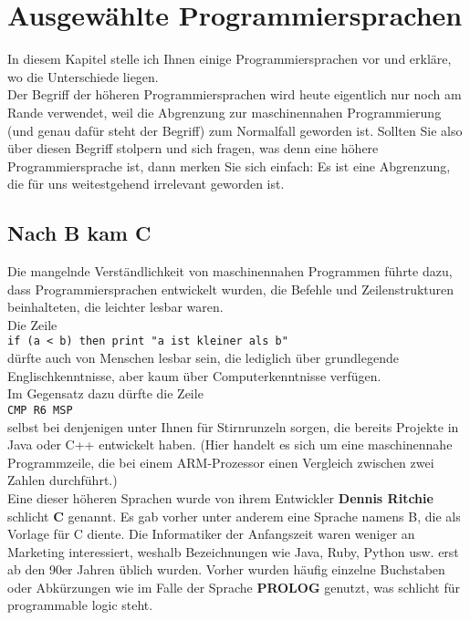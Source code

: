 \chapter{Ausgewählte Programmiersprachen}
In diesem Kapitel stelle ich Ihnen einige Programmiersprachen vor und erkläre, wo die Unterschiede liegen.\\

Der Begriff der höheren Programmiersprachen wird heute eigentlich nur noch am Rande verwendet, weil die Abgrenzung zur maschinennahen Programmierung (und genau dafür steht der Begriff) zum Normalfall geworden ist. Sollten Sie also über diesen Begriff stolpern und sich fragen, was denn eine höhere Programmiersprache ist, dann merken Sie sich einfach: Es ist eine Abgrenzung, die für uns weitestgehend irrelevant geworden ist.

\section{Nach B kam C}
Die mangelnde Verständlichkeit von maschinennahen Programmen führte dazu, dass Programmiersprachen entwickelt wurden, die Befehle und Zeilenstrukturen beinhalteten, die leichter lesbar waren.\\

Die Zeile \\

\verb~if (a < b) then print "a ist kleiner als b"~\\

dürfte auch von Menschen lesbar sein, die lediglich über grundlegende Englischkenntnisse, aber kaum über Computerkenntnisse verfügen.\\

Im Gegensatz dazu dürfte die Zeile\\

\verb~CMP R6 MSP~\\

selbst bei denjenigen unter Ihnen für Stirnrunzeln sorgen, die bereits Projekte in Java oder C++ entwickelt haben. (Hier handelt es sich um eine maschinennahe Programmzeile, die bei einem ARM-Prozessor einen Vergleich zwischen zwei Zahlen durchführt.)\\

Eine dieser höheren Sprachen wurde von ihrem Entwickler \textbf{Dennis Ritchie} schlicht \textbf{C} genannt. Es gab vorher unter anderem eine Sprache namens B, die als Vorlage für C diente. Die Informatiker der Anfangszeit waren weniger an Marketing interessiert, weshalb Bezeichnungen wie Java, Ruby, Python usw. erst ab den 90er Jahren üblich wurden. Vorher wurden häufig einzelne Buchstaben oder Abkürzungen wie im Falle der Sprache \textbf{PROLOG} genutzt, was schlicht für programmable logic steht.\\

